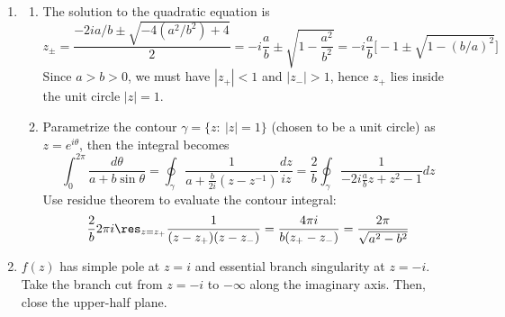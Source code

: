 \documentclass[a4paper]{article}
\begin{document}
\begin{ans}\leavevmode
\begin{enumerate}[label=(\roman*)]
\item
\begin{enumerate}[label=(\alph*)]
\item  The solution to the quadratic equation is
$$z_{\pm}=\frac{-2ia/b\pm\sqrt{-4(a^2/b^2)+4}}{2}=-i\frac{a}{b}\pm\sqrt{1-\frac{a^2}{b^2}}=-i\frac{a}{b}\bigg[-1\pm\sqrt{1-(b/a)^2}\bigg]$$
Since $a>b>0$, we must have $|z_+|<1$ and $|z_-|>1$, hence $z_+$ lies inside the unit circle $|z|=1$.
\item Parametrize the contour $\gamma=\{z:~|z|=1\}$ (chosen to be a unit circle) as $z=e^{i\theta}$, then the integral becomes
$$\int_0^{2\pi}\frac{d\theta}{a+b\sin\theta}=\oint_{\gamma}\frac{1}{a+\frac{b}{2i}(z-z^{-1})}\frac{dz}{iz}=\frac{2}{b}\oint_\gamma\frac{1}{-2i\frac{a}{b}z+z^2-1}dz$$
Use residue theorem to evaluate the contour integral:
$$\frac{2}{b}2\pi i\res_{z=z_+}\frac{1}{(z-z_+)(z-z_-)}=\frac{4\pi i}{b(z_+-z_-)}=\frac{2\pi}{\sqrt{a^2-b^2}}$$
\end{enumerate}
\item $f(z)$ has simple pole at $z=i$ and essential branch singularity at $z=-i$. Take the branch cut from $z=-i$ to $-\infty$ along the imaginary axis. Then, close the upper-half plane. 
\begin{center}
\end{center}
\end{enumerate}
\end{ans}
\end{document}
